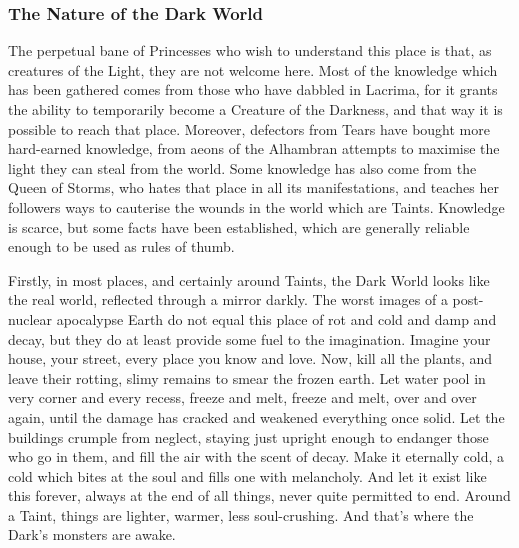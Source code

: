 \subsubsection*{The Nature of the Dark World}
The perpetual bane of Princesses who wish to understand this place is that, as creatures of the Light, they are not welcome here. Most of the knowledge which has been gathered comes from those who have dabbled in Lacrima, for it grants the ability to temporarily become a Creature of the Darkness, and that way it is possible to reach that place. Moreover, defectors from Tears have bought more hard-earned knowledge, from aeons of the Alhambran attempts to maximise the light they can steal from the world. Some knowledge has also come from the Queen of Storms, who hates that place in all its manifestations, and teaches her followers ways to cauterise the wounds in the world which are Taints. Knowledge is scarce, but some facts have been established, which are generally reliable enough to be used as rules of thumb.

Firstly, in most places, and certainly around Taints, the Dark World looks like the real world, reflected through a mirror darkly. The worst images of a post-nuclear apocalypse Earth do not equal this place of rot and cold and damp and decay, but they do at least provide some fuel to the imagination. Imagine your house, your street, every place you know and love. Now, kill all the plants, and leave their rotting, slimy remains to smear the frozen earth. Let water pool in very corner and every recess, freeze and melt, freeze and melt, over and over again, until the damage has cracked and weakened everything once solid. Let the buildings crumple from neglect, staying just upright enough to endanger those who go in them, and fill the air with the scent of decay. Make it eternally cold, a cold which bites at the soul and fills one with melancholy. And let it exist like this forever, always at the end of all things, never quite permitted to end. Around a Taint, things are lighter, warmer, less soul-crushing. And 
that's where the Dark's monsters are awake.


